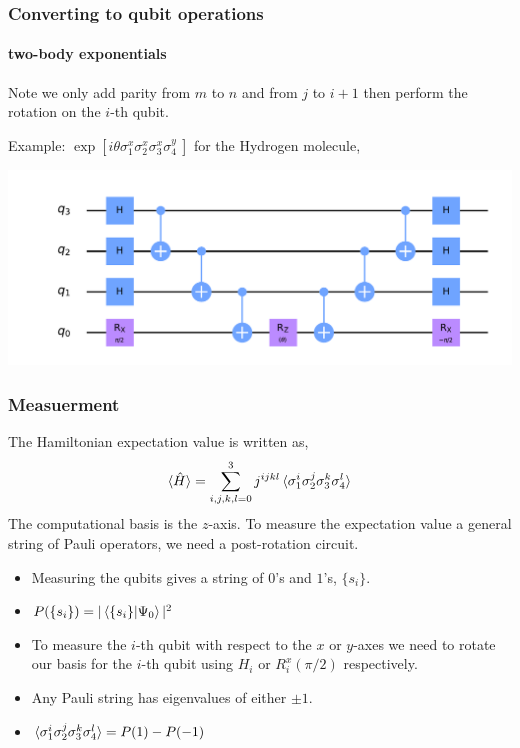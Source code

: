 \documentclass{beamer}
\renewcommand{\(}{\left(}
\renewcommand{\)}{\right)}
\renewcommand{\[}{\left[}
\renewcommand{\]}{\right]}
\begin{document}
\begin{frame}
    \frametitle{Converting to qubit operations}
    \framesubtitle{two-body exponentials}
    Note we only add parity from $m$ to $n$ and from $j$ to $i+1$ then perform the rotation on the $i$-th qubit.
     
    Example: $\exp{\[ i\theta \sigma^x_1 \sigma^x_2 \sigma^x_3 \sigma^y_4  \ \]}$ for the Hydrogen molecule, 

    \begin{center}
        \includegraphics[scale=0.45, trim = 65 0 0 0 , clip]{a1a2a3a4.pdf}
    \end{center}
\end{frame}

\begin{frame}
    \frametitle{Measuerment}
    The Hamiltonian expectation value is written as, 
    \begin{align*}
        \braket{\hat{H}} = \sum_{i,j,k,l = 0}^ 3 j^{ijkl}\braket{\sigma^i_1 \sigma^j_2 \sigma^k_3 \sigma^l_4} 
    \end{align*}
    The computational basis is the $z$-axis. To measure the expectation value a general string of Pauli operators, we need a post-rotation circuit. 
    \begin{itemize}
        \item Measuring the qubits gives a string of $0$'s and $1$'s, $\{s_i\}$.
        \item $P(\{ s_i \}) = |\braket{\{s_i\} | \Psi_0}|^2$
        \item To measure the $i$-th qubit with respect to the $x$ or $y$-axes we need to rotate our basis for the $i$-th qubit using $H_i$ or $R_i^{x}(\pi/2)$ respectively. 
        \item Any Pauli string has eigenvalues of either $\pm 1$.
        \item $\braket{\sigma^i_1 \sigma^j_2 \sigma^k_3 \sigma^l_4} = P(1) - P(-1)$ 
    \end{itemize}
\end{frame}
\end{document}
